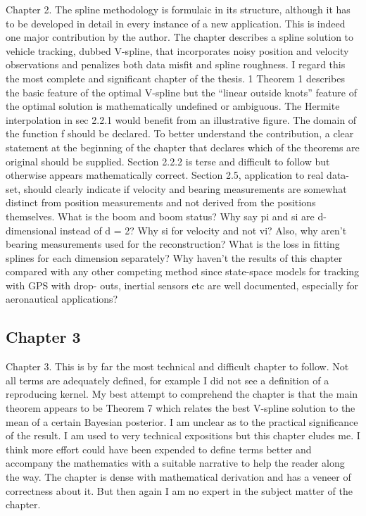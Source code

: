 \documentclass[a4paper,18pt]{extarticle}
\begin{document}
Chapter 2. The spline methodology is formulaic in its structure, although it has to be developed in detail in every instance of a new application. This is indeed one major contribution by the author. The chapter describes a spline solution to vehicle tracking, dubbed V-spline, that incorporates noisy position and velocity observations and penalizes both data misfit and spline roughness. I regard this the most complete and significant chapter of the thesis. 
1 
Theorem 1 describes the basic feature of the optimal V-spline but the “linear outside knots” feature of the optimal solution is mathematically undefined or ambiguous. The Hermite interpolation in sec 2.2.1 would benefit from an illustrative figure. The domain of the function f should be declared. To better understand the contribution, a clear statement at the beginning of the chapter that declares which of the theorems are original should be supplied. Section 2.2.2 is terse and difficult to follow but otherwise appears mathematically correct. 
Section 2.5, application to real data-set, should clearly indicate if velocity and bearing measurements are somewhat distinct from position measurements and not derived from the positions themselves. What is the boom and boom status? Why say pi and si are d-dimensional instead of d = 2? Why si for velocity and not vi? Also, why aren’t bearing measurements used for the reconstruction? What is the loss in fitting splines for each dimension separately? Why haven’t the results of this chapter compared with any other competing method since state-space models for tracking with GPS with drop- outs, inertial sensors etc are well documented, especially for aeronautical applications? 


\subsection{Chapter 3}

Chapter 3. This is by far the most technical and difficult chapter to follow. Not all terms are adequately defined, for example I did not see a definition of a reproducing kernel. My best attempt to comprehend the chapter is that the main theorem appears to be Theorem 7 which relates the best V-spline solution to the mean of a certain Bayesian posterior. I am unclear as to the practical significance of the result. 
I am used to very technical expositions but this chapter eludes me. I think more effort could have been expended to define terms better and accompany the mathematics with a suitable narrative to help the reader along the way. The chapter is dense with mathematical derivation and has a veneer of correctness about it. But then again I am no expert in the subject matter of the chapter. 
\end{document}
